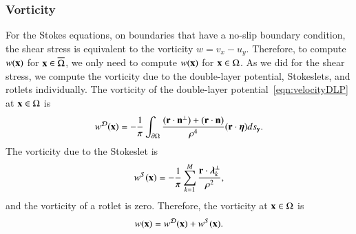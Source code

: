 \documentclass[preprint, 10pt]{elsarticle}
\begin{document}
\subsubsection{Vorticity}
For the Stokes equations, on boundaries that have a no-slip boundary
condition, the shear stress is equivalent to the vorticity $w = v_x -
u_y$.  Therefore, to compute $w({\mathbf{x}})$ for ${\mathbf{x}} \in \overline{\Omega}$,
we only need to compute $w({\mathbf{x}})$ for ${\mathbf{x}} \in \Omega$.  As we did for
the shear stress, we compute the vorticity due to the double-layer
potential, Stokeslets, and rotlets individually.  The vorticity of the
double-layer potential~\eqref{eqn:velocityDLP} at ${\mathbf{x}} \in \Omega$ is
\begin{align}
  w^{{\mathcal{D}}}({\mathbf{x}}) = -\frac{1}{\pi}\int_{{\partial}\Omega} 
    \frac{({\mathbf{r}} \cdot {\mathbf{n}}^\perp) + ({\mathbf{r}} \cdot {\mathbf{n}})}{\rho^4}
    ({\mathbf{r}} \cdot {\boldsymbol\eta}) ds_{{\mathbf{y}}}.
  \label{eqn:vorticityDLP}
\end{align}
The vorticity due to the Stokeslet is
\begin{align*}
  w^S({\mathbf{x}}) = -\frac{1}{\pi} \sum_{k=1}^{M} 
    \frac{{\mathbf{r}} \cdot {\boldsymbol\lambda}_k^\perp}{\rho^2},
\end{align*}
and the vorticity of a rotlet is zero.  Therefore, the vorticity at ${\mathbf{x}}
\in \Omega$ is
\begin{align*}
  w({\mathbf{x}}) = w^{\mathcal{D}}({\mathbf{x}}) + w^S({\mathbf{x}}).
\end{align*}


\end{document}

